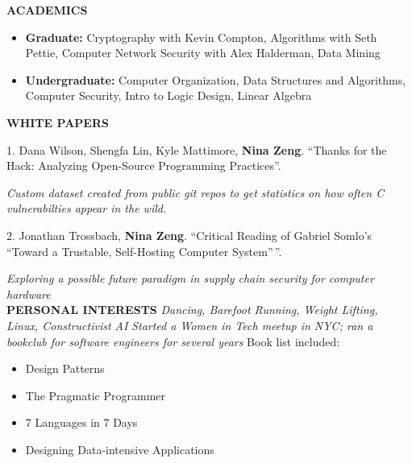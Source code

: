 \documentclass[11pt,a4paper]{article}
\begin{document}
\textbf{ACADEMICS}
\begin{itemize}
\item \textbf{Graduate:} Cryptography with Kevin Compton, Algorithms with Seth
Pettie, Computer Network Security with Alex Halderman, Data Mining

\item \textbf{Undergraduate:} Computer Organization, Data Structures and
Algorithms, Computer Security, Intro to Logic Design, Linear Algebra
\end{itemize}

\textbf{WHITE PAPERS}

1. Dana Wilson, Shengfa Lin, Kyle Mattimore, \textbf{Nina Zeng}.
``Thanks for the Hack: Analyzing Open-Source Programming Practices''.

\emph{Custom dataset created from public git repos to get statistics on
how often C vulnerabilties appear in the wild.}

2. Jonathan Trossbach, \textbf{Nina Zeng}. ``Critical Reading of Gabriel
Somlo's ``Toward a Trustable, Self-Hosting Computer System''\,''.

\emph{Exploring a possible future paradigm in supply chain security for
computer hardware}
\\
\textbf{PERSONAL INTERESTS}
\emph{Dancing, Barefoot Running, Weight Lifting, Linux, Constructivist
AI}
\emph{Started a Women in Tech meetup in NYC; ran a bookclub for software
engineers for several years} Book list included:
\begin{itemize}
\item Design Patterns
\item The Pragmatic Programmer
\item 7 Languages in 7 Days
\item Designing Data-intensive Applications
\end{itemize}
\end{document}
